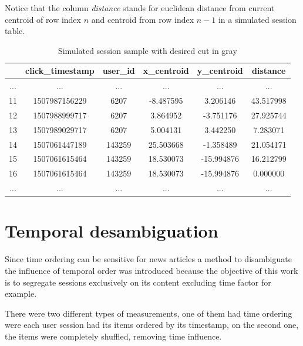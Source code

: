 \documentclass[ecp,tc,english]{iiufrgs}
\begin{document}
        Notice that the column \textit{distance} stands for euclidean distance from current centroid of row index \(n\) and centroid from row index \(n - 1\) in a simulated session table.
        
        \begin{table}[H]
            \centering
            \begin{tabular}{ |c|c|c|c|c|c| } 
                \hline
                \  & click\_timestamp & user\_id & x\_centroid & y\_centroid & distance \\
                \hline 
                 ... & ... & ... & ... & ... & ... \\
                 11 & 1507987156229 & 6207 & -8.487595 & 3.206146 & 43.517998 \\
                 12 & 1507988999717 & 6207 & 3.864952 & -3.751176 & 27.925744 \\
                 13 & 1507989029717 & 6207 & 5.004131 & 3.442250 & 7.283071 \\
                 \rowcolor[RGB]{220,220,220}
                 14 & 1507061447189 & 143259 & 25.503668 & -1.358489 & 21.054171 \\
                 15 & 1507061615464 & 143259 & 18.530073 & -15.994876 & 16.212799 \\
                 16 & 1507061615464 & 143259 & 18.530073 & -15.994876 & 0.000000 \\
                 ... & ... & ... & ... & ... & ... \\
                \hline
            \end{tabular}
            \caption{Simulated session sample with desired cut in gray}
            \label{tab:session_simulation}
        \end{table}
        
        \section{Temporal desambiguation} \label{temporal_ordering_factor}
        
        Since time ordering can be sensitive for news articles a method to disambiguate the influence of temporal order was introduced because the objective of this work is to segregate sessions exclusively on its content excluding time factor for example.
        
        There were two different types of measurements, one of them had time ordering were each user session had its items ordered by its timestamp, on the second one, the items were completely shuffled, removing time influence.
        
\end{document}
